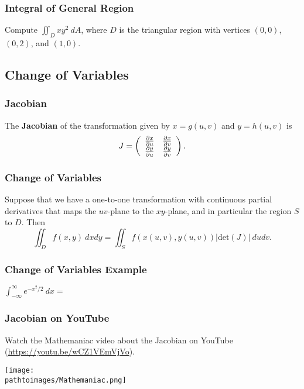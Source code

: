 \documentclass{beamer}
\newcommand{\pathtoimages}{/Users/charlesrambo/Desktop/Bootcamp24/Images}
\begin{document}
\begin{frame}[t]
\frametitle{Integral of General  Region}
\begin{Example}
Compute $\displaystyle\iint_D xy^2\ dA$, where $D$ is the triangular region with vertices $(0, 0)$, $(0, 2)$, and $(1, 0)$.
\end{Example}

\end{frame}

\subsection{Change of Variables}

\begin{frame}
\frametitle{Jacobian}
\begin{Definition}
The {\bf Jacobian} of the transformation given by $x = g(u, v)$ and $y = h(u, v)$ is
$$
J = \left(\begin{array}{c c} \frac{\partial x}{\partial u}	&	\frac{\partial x}{\partial v}\\ \frac{\partial y}{\partial u} &	\frac{\partial y}{\partial v}\end{array}\right).
$$
\end{Definition} 

\end{frame}

\begin{frame}
\frametitle{Change of Variables}
Suppose that we have a one-to-one transformation with continuous partial derivatives that maps the $uv$-plane to the $xy$-plane, and in particular the region $S$ to $D$. Then
$$
\iint_D f(x, y)\ dxdy = \iint_S f\left(x(u, v), y(u, v)\right)\left|\text{det}(J)\right|\ dudv.
$$

\end{frame}

\begin{frame}[t]
\frametitle{Change of Variables Example}
\begin{Example}
$\displaystyle\int_{-\infty}^{\infty} e^{-x^2/2}\ dx = $
\end{Example}

\end{frame}

\begin{frame}
\frametitle{Jacobian on YouTube}
\small
Watch the Mathemaniac video about the Jacobian on YouTube (\url{https://youtu.be/wCZ1VEmVjVo}).
\begin{center}
\texttt{[image: \\pathtoimages/Mathemaniac.png]}
\end{center}
\end{frame}
\end{document}
